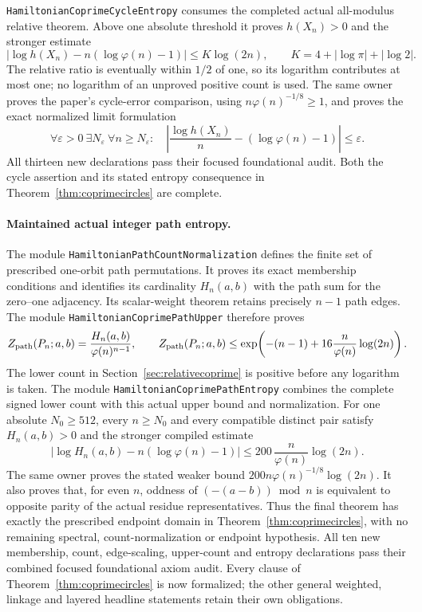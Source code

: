 \texttt{HamiltonianCoprimeCycleEntropy} consumes the completed
actual all-modulus relative theorem. Above one absolute
threshold it proves \(h(X_n)>0\) and the stronger estimate
\[
 \left|\log h(X_n)-n(\log\varphi(n)-1)\right|
                 \leq K\log(2n),\qquad
 K=4+|\log\pi|+|\log2|.
\]
The relative ratio is eventually within \(1/2\) of one,
so its logarithm contributes at most one; no logarithm of
an unproved positive count is used.
The same owner proves the paper's cycle-error comparison,
using \(n\varphi(n)^{-1/8}\geq1\), and proves the exact
normalized limit formulation
\[
 \forall\varepsilon>0\ \exists N_\varepsilon\
 \forall n\geq N_\varepsilon:\quad
 \left|\frac{\log h(X_n)}n-(\log\varphi(n)-1)\right|
                                      \leq\varepsilon.
\]
All thirteen new declarations pass their focused foundational
audit. Both the cycle assertion and its stated entropy
consequence in Theorem~\ref{thm:coprimecircles} are complete.
\paragraph{Maintained actual integer path entropy.}
The module \texttt{HamiltonianPathCountNormalization} defines the
finite set of prescribed one-orbit path permutations. It proves
its exact membership conditions and identifies its cardinality
\(H_n(a,b)\) with the path sum for the zero--one adjacency.
Its scalar-weight theorem retains precisely \(n-1\) path edges.
The module \texttt{HamiltonianCoprimePathUpper} therefore proves
\[
 Z_{\rm path}(P_n;a,b)=\frac{H_n(a,b)}{\varphi(n)^{n-1}},
 \qquad
 Z_{\rm path}(P_n;a,b)
 \leq\exp\!\left(-(n-1)+16\frac n{\varphi(n)}\log(2n)\right).
\]
The lower count in Section~\ref{sec:relativecoprime} is positive
before any logarithm is taken.
The module \texttt{HamiltonianCoprimePathEntropy} combines the
complete signed lower count with this actual upper bound and
normalization. For one absolute \(N_0\geq512\), every \(n\geq N_0\)
and every compatible distinct pair satisfy \(H_n(a,b)>0\) and
the stronger compiled estimate
\[
 \left|\log H_n(a,b)-n(\log\varphi(n)-1)\right|
     \leq200\,\frac n{\varphi(n)}\log(2n).
\]
The same owner proves the stated weaker bound
\(200n\varphi(n)^{-1/8}\log(2n)\).
It also proves that, for even \(n\), oddness of
\((-(a-b))\bmod n\) is equivalent to opposite parity of the
actual residue representatives. Thus the final theorem has
exactly the prescribed endpoint domain in
Theorem~\ref{thm:coprimecircles}, with no remaining spectral,
count-normalization or endpoint hypothesis.
All ten new membership, count, edge-scaling, upper-count and
entropy declarations pass their combined focused foundational
axiom audit. Every clause of Theorem~\ref{thm:coprimecircles}
is now formalized; the other general weighted, linkage and
layered headline statements retain their own obligations.

